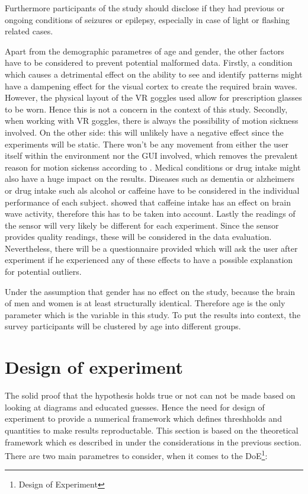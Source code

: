             Furthermore participants of the study should disclose if they had previous or ongoing conditions of seizures or epilepsy, especially in case of light or flashing related cases.

            Apart from the demographic parametres of age and gender, the other factors have to be considered to prevent potential malformed data. Firstly, a condition which causes a detrimental effect on the ability to see and identify patterns might have a dampening effect for the visual cortex to create the required brain waves. However, the physical layout of the VR goggles used allow for prescription glasses to be worn. Hence this is not a concern in the context of this study. Secondly, when working with VR goggles, there is always the possibility of motion sickness involved. On the other side: this will unlikely have a negative effect since the experiments will be static. There won't be any movement from either the user itself within the environment nor the GUI involved, which removes the prevalent reason for motion sickenss according to \cite{Golding.2006}.
            Medical conditions or drug intake might also have a huge impact on the results. Diseases such as dementia or alzheimers or drug intake such als alcohol or caffeine have to be considered in the individual performance of each subject. \cite{Kenemans.1995} showed that caffeine intake has an effect on brain wave activity, therefore this has to be taken into account.
            Lastly the readings of the sensor will very likely be different for each experiment. Since the sensor provides quality readings, these will be considered in the data evaluation. Nevertheless, there will be a questionnaire provided which will ask the user after experiment if he experienced any of these effects to have a possible explanation for potential outliers.

            \medskip

            Under the assumption that gender has no effect on the study, because the brain of men and women is at least structurally identical. Therefore age is the only parameter which is the variable in this study. To put the results into context, the survey participants will be clustered by age into different groups.

        \section{Design of experiment}\label{doe}

            The solid proof that the hypothesis holds true or not can not be made based on looking at diagrams and educated guesses. Hence the need for design of experiment to provide a numerical framework which defines threshholds and quantities to make results reproductable. This section is based on the theoretical framework which es described in \cite[87ff]{Siebertz.2017} under the considerations in the previous section.
            There are two main parametres to consider, when it comes to the DoE\footnote{Design of Experiment}: 
            
